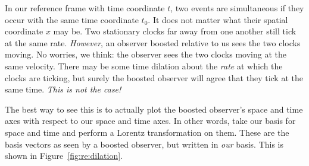 \documentclass[12pt, oneside]{report}    %
\begin{document}
In our reference frame with time coordinate $t$, two events are simultaneous if they occur with the same time coordinate $t_0$. It does not matter what their spatial coordinate $x$ may be. Two stationary clocks far away from one another still tick at the same rate. \emph{However}, an observer boosted relative to us sees the two clocks moving. No worries, we think: the observer sees the two clocks moving at the same velocity. There may be some time dilation about the \emph{rate} at which the clocks are ticking, but surely the boosted observer will agree that they tick at the same time. \emph{This is not the case!}


\begin{exercise}
The best way to see this is to actually plot the boosted observer's space and time axes with respect to our space and time axes. In other words, take our basis for space and time and perform a Lorentz transformation on them. These are the basis vectors as seen by a boosted observer, but written in \emph{our} basis. This is shown in Figure~\ref{fig:re:dilation}.
\end{exercise}
\end{document}
